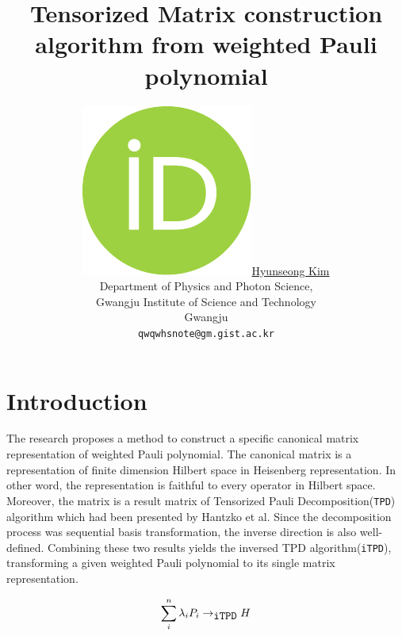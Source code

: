 \documentclass[twocolumn]{article}
\title{Tensorized Matrix construction algorithm from weighted Pauli polynomial
}
\author{
    \href{https://orcid.org/0000-0002-4876-7820}{
        \includegraphics[scale=0.06]{orcid.pdf}\hspace{1mm}Hyunseong Kim}\\
  Department of Physics and Photon Science,  \\
  Gwangju Institute of Science and Technology\\
  Gwangju\\
  \texttt{qwqwhsnote@gm.gist.ac.kr} \\
}
\begin{document}
\section{Introduction}
The research proposes a method to construct 
a specific canonical matrix representation of weighted Pauli polynomial.
The canonical matrix is a representation of finite dimension Hilbert space 
in Heisenberg representation. 
In other word, the representation is faithful to every operator in Hilbert space.
Moreover, the matrix is a result matrix of Tensorized Pauli Decomposition(\texttt{TPD}) algorithm 
which had been presented by Hantzko et al\cite{Hantzko_2024}.
Since the decomposition process was sequential basis transformation,
the inverse direction is also well-defined. 
Combining these two results yields the inversed TPD algorithm(\texttt{iTPD}),
transforming a given weighted Pauli polynomial to its single matrix representation.

\begin{equation}
    \sum_i^n \lambda_i P_i \rightarrow_{\mbox{\texttt{iTPD}}} H
\end{equation}
\end{document}
